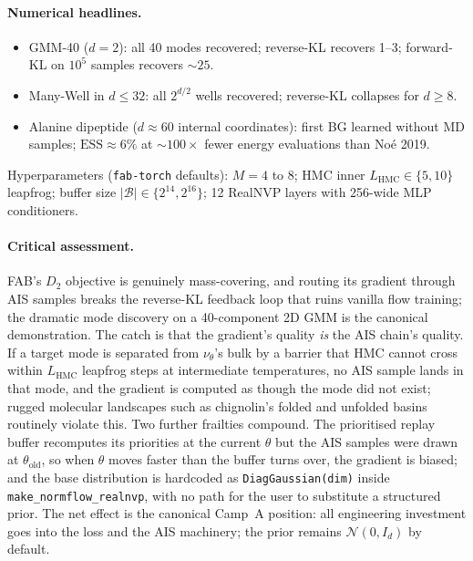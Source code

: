 \documentclass[11pt,letterpaper]{article}
\newcommand{\ESS}{\mathrm{ESS}}
\newcommand{\Le}{\leqslant}
\newcommand{\Ge}{\geqslant}
\theoremstyle{plain}
\begin{document}
\paragraph{Numerical headlines.}
\begin{itemize}\setlength{\itemsep}{2pt}
  \item GMM-40 ($d=2$): all 40 modes recovered; reverse-KL recovers 1--3; forward-KL on $10^5$ samples recovers $\sim 25$.
  \item Many-Well in $d\Le 32$: all $2^{d/2}$ wells recovered; reverse-KL collapses for $d\Ge 8$.
  \item Alanine dipeptide ($d\approx 60$ internal coordinates): first BG learned without MD samples; $\ESS\approx 6\%$ at $\sim 100\times$ fewer energy evaluations than Noé 2019.
\end{itemize}

Hyperparameters (\texttt{fab-torch} defaults): $M=4$ to $8$; HMC inner $L_{\mathrm{HMC}}\in\{5,10\}$ leapfrog; buffer size $|\mathcal B|\in\{2^{14}, 2^{16}\}$; 12 RealNVP layers with 256-wide MLP conditioners.

\paragraph{Critical assessment.}
FAB's $D_2$ objective is genuinely mass-covering, and routing its gradient
through AIS samples breaks the reverse-KL feedback loop that ruins vanilla
flow training; the dramatic mode discovery on a 40-component 2D GMM is the
canonical demonstration. The catch is that the gradient's quality \emph{is}
the AIS chain's quality. If a target mode is separated from $\nu_\theta$'s
bulk by a barrier that HMC cannot cross within $L_{\mathrm{HMC}}$ leapfrog
steps at intermediate temperatures, no AIS sample lands in that mode, and the
gradient is computed as though the mode did not exist; rugged molecular
landscapes such as chignolin's folded and unfolded basins routinely violate
this. Two further frailties compound. The prioritised replay buffer
recomputes its priorities at the current $\theta$ but the AIS samples were
drawn at $\theta_{\mathrm{old}}$, so when $\theta$ moves faster than the
buffer turns over, the gradient is biased; and the base distribution is
hardcoded as \verb|DiagGaussian(dim)| inside \verb|make_normflow_realnvp|,
with no path for the user to substitute a structured prior. The net effect is
the canonical Camp~A position: all engineering investment goes into the loss
and the AIS machinery; the prior remains $\mathcal N(0,I_d)$ by default.
\end{document}
